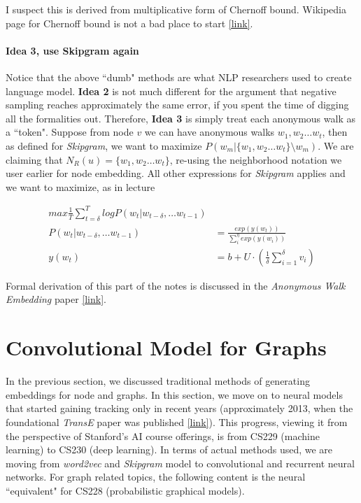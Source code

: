 \begin{todo}
    I suspect this is derived from multiplicative form of Chernoff bound. Wikipedia page for Chernoff bound is not a bad place to start \href{https://en.wikipedia.org/wiki/Chernoff_bound}{[link]}.
\end{todo}{}

\paragraph{Idea 3, use Skipgram again} Notice that the above ``dumb" methods are what NLP researchers used to create language model. \textbf{Idea 2} is not much different for the argument that negative sampling reaches approximately the same error, if you spent the time of digging all the formalities out. Therefore, \textbf{Idea 3} is simply treat each anonymous walk as a ``token". Suppose from node $v$ we can have anonymous walks $w_1, w_2 \dots w_t$, then as defined for \textit{Skipgram}, we want to maximize $P(w_m | \{w_1, w_2 \dots w_t\} \setminus w_m)$. We are claiming that $N_R(u) = \{w_1, w_2 \dots w_t\}$, re-using the neighborhood notation we user earlier for node embedding. All other expressions for \textit{Skipgram} applies and we want to maximize, as in lecture

\begin{align}
    max \frac{1}{T}\sum_{t=\delta}^{T}log P(w_t|w_{t-\delta}, \dots w_{t-1})\\
    P(w_t|w_{t-\delta}, \dots w_{t-1}) &= \frac{exp(y(w_t))}{\sum_i^{\eta} exp(y(w_i))} \\
    y(w_t) &= b + U \cdot (\frac{1}{\delta}\sum_{i=1}^{\delta}v_i)
\end{align}{}

Formal derivation of this part of the notes is discussed in the \textit{Anonymous Walk Embedding} paper \href{https://arxiv.org/pdf/1805.11921.pdf}{[link]}.


\section{Convolutional Model for Graphs}

In the previous section, we discussed traditional methods of generating embeddings for node and graphs. In this section, we move on to neural models that started gaining tracking only in recent years (approximately 2013, when the foundational \textit{TransE} paper was published \href{https://papers.nips.cc/paper/5071-translating-embeddings-for-modeling-multi-relational-data.pdf}{[link]}). This progress, viewing it from the perspective of Stanford's AI course offerings, is from CS229 (machine learning) to CS230 (deep learning). In terms of actual methods used, we are moving from \textit{word2vec} and \textit{Skipgram} model to convolutional and recurrent neural networks. For graph related topics, the following content is the neural ``equivalent" for CS228 (probabilistic graphical models).

